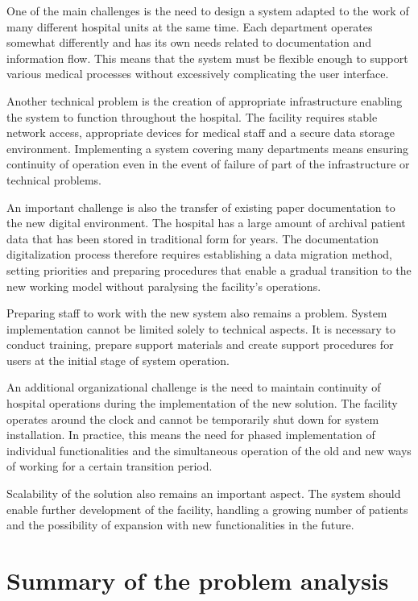 One of the main challenges is the need to design a system adapted to the work of many different hospital units at the same time. Each department operates somewhat differently and has its own needs related to documentation and information flow. This means that the system must be flexible enough to support various medical processes without excessively complicating the user interface.

Another technical problem is the creation of appropriate infrastructure enabling the system to function throughout the hospital. The facility requires stable network access, appropriate devices for medical staff and a secure data storage environment.
Implementing a system covering many departments means ensuring continuity of operation even in the event of failure of part of the infrastructure or technical problems.

An important challenge is also the transfer of existing paper documentation to the new digital environment. The hospital has a large amount of archival patient data that has been stored in traditional form for years. The documentation digitalization process therefore requires establishing a data migration method, setting priorities and preparing procedures that enable a gradual transition to the new working model without paralysing the facility's operations.

Preparing staff to work with the new system also remains a problem. System implementation cannot be limited solely to technical aspects. It is necessary to conduct training, prepare support materials and create support procedures for users at the initial stage of system operation.

An additional organizational challenge is the need to maintain continuity of hospital operations during the implementation of the new solution. The facility operates around the clock and cannot be temporarily shut down for system installation. In practice, this means the need for phased implementation of individual functionalities and the simultaneous operation of the old and new ways of working for a certain transition period.

Scalability of the solution also remains an important aspect. The system should enable further development of the facility, handling a growing number of patients and the possibility of expansion with new functionalities in the future.
\section{Summary of the problem analysis}
